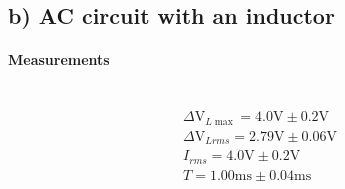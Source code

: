 \documentclass{report}
\begin{document}
\subsection*{b) AC circuit with an inductor}
\paragraph{Measurements}\mbox{}\\
\begin{gather}
    \Delta\si{\volt}_{L\max}=4.0\si{\volt}\pm0.2\si{\volt}\\
    \Delta\si{\volt}_{Lrms}=2.79\si{\volt}\pm0.06\si{\volt}\\ 
    I_{rms}=4.0\si{\volt}\pm0.2\si{\volt}\\ 
    T=1.00\si{\milli}\si{\second}\pm0.04\si{\milli}\si{\second}
\end{gather}
\end{document}
